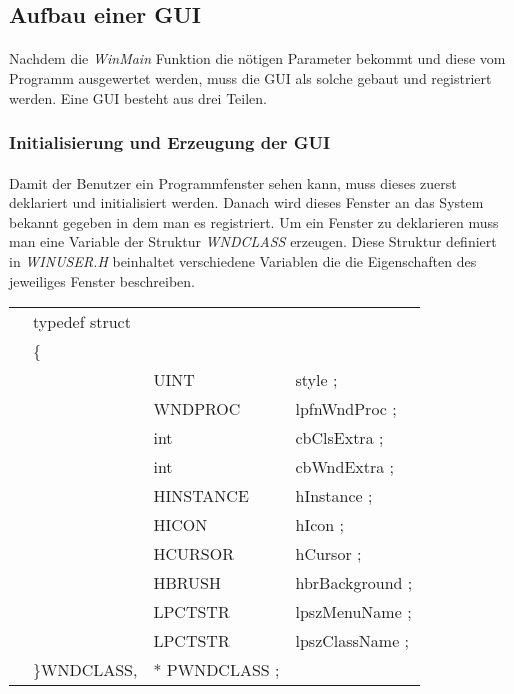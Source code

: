 \subsection{Aufbau einer GUI}
\paragraph{}
Nachdem die \textit{WinMain} Funktion die nötigen Parameter bekommt und diese vom Programm ausgewertet werden, muss die GUI als solche gebaut und registriert werden. Eine GUI besteht aus drei Teilen.


\subsubsection{Initialisierung und Erzeugung der GUI}
\paragraph{}
Damit der Benutzer ein Programmfenster sehen kann, muss dieses zuerst deklariert und initialisiert werden. Danach wird dieses Fenster an das System bekannt gegeben in dem man es registriert. Um ein Fenster zu deklarieren muss man eine Variable der Struktur \textit{WNDCLASS} erzeugen. Diese Struktur definiert in \textit{WINUSER.H} beinhaltet verschiedene Variablen die die Eigenschaften des jeweiliges Fenster beschreiben.



\begin{tabular}{llll}
& typedef struct\\
& \{\\
& & UINT        & style ;\\
& & WNDPROC     & lpfnWndProc ;\\
& & int         & cbClsExtra ;\\
& & int         & cbWndExtra ;\\
& & HINSTANCE   & hInstance ;\\
& & HICON       & hIcon ;\\
& & HCURSOR     & hCursor ;\\
& & HBRUSH      & hbrBackground ;\\
& & LPCTSTR     & lpszMenuName ;\\
& & LPCTSTR     & lpszClassName ;\\
&\}WNDCLASS,&* PWNDCLASS ;
\end{tabular}
\\


